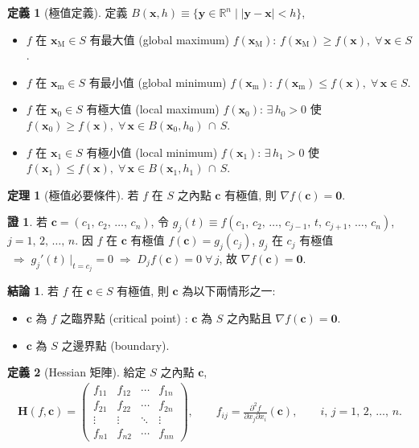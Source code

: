 \documentclass[12pt]{extarticle}
\newcommand{\ds}{\displaystyle}
\newcommand{\ie}{\;\Longrightarrow\;}
\theoremstyle{definition}
\newtheorem*{dfn}{定義}
\newtheorem*{fact}{結論}
\newtheorem*{thm}{定理}
\newtheorem*{prf}{證}
\newcommand{\vc}{\mathbf{c}}
\newcommand{\vx}{\mathbf{x}}
\newcommand{\vy}{\mathbf{y}}
\newcommand{\vH}{\mathbf{H}}
\newcommand{\vZero}{\mathbf{0}}
\begin{document}
\begin{dfn}[極值定義] 定義 $\ds B(\vx, h)\equiv\{\vy\in\mathbb{R}^n\;|\;|\vy - \vx| < h\}$,
  \begin{itemize}\setlength\itemsep{0em}
    \item $f$ 在 $\ds\vx_\text{M}\in S$ 有最大值 (global maximum) $\ds f(\vx_\text{M})$: $\ds f(\vx_\text{M})\geqslant f(\vx),\;\forall\,\vx\in S$. 
    \item $f$ 在 $\ds \vx_\text{m}\in S$ 有最小值 (global minimum) $\ds f(\vx_\text{m})$: $\ds f(\vx_\text{m})\leqslant f(\vx),\;\forall\,\vx\in S$. 
    \item $f$ 在 $\ds\vx_0\in S$ 有極大值 (local maximum) $\ds f(\vx_0)$: $\ds\exists\,h_0 > 0$ 使 $\ds f(\vx_0)\geqslant f(\vx),\;\forall\,\vx\in B(\vx_0, h_0)\,\cap\,S$. 
    \item $f$ 在 $\ds\vx_1\in S$ 有極小值 (local minimum) $\ds f(\vx_1)$: $\ds\exists\,h_1 > 0$ 使 $\ds f(\vx_1)\leqslant f(\vx),\;\forall\,\vx\in B(\vx_1, h_1)\,\cap\,S$. 
  \end{itemize}
\end{dfn}

\begin{thm}[極值必要條件]
  若 $f$ 在 $S$ 之內點 $\vc$ 有極值, 則 $\ds\nabla f(\vc) = \vZero$. 
\end{thm}

\begin{prf}
  若 $\ds\vc = (c_1,\,c_2,\,\ldots,\,c_n)$, 令 $\ds g_j(t)\equiv f(c_1,\,c_2,\,\ldots,\,c_{j - 1},\,t,\,c_{j + 1},\,\ldots,\,c_n)$, $j = 1,\,2,\,\ldots,\,n$. 因 $f$ 在 $\vc$ 有極值 $f(\vc) = g_j(c_j)$, $g_j$ 在 $c_j$ 有極值 $\ie g_j'(t)\,\big|_{t = c_j} = 0 \ie D_j f(\vc) = 0\;\forall\,j$, 故 $\ds\nabla f(\vc) = \vZero$.  
\end{prf}

\begin{fact}
  若 $f$ 在 $\vc\in S$ 有極值, 則 $\vc$ 為以下兩情形之一: 
  \begin{itemize}\setlength\itemsep{0em}
    \item $\vc$ 為 $f$ 之臨界點 (critical point) : $\vc$ 為 $S$ 之內點且 $\nabla f(\vc) = \vZero$. 
    \item $\vc$ 為 $S$ 之邊界點 (boundary). 
  \end{itemize}
\end{fact}

\begin{dfn}[Hessian 矩陣]
  給定 $S$ 之內點 $\vc$, 
  \begin{align*}
    \vH(f, \vc) = \begin{pmatrix}f_{11} & f_{12} & \cdots & f_{1n} \\ f_{21} & f_{22} & \cdots & f_{2n} \\ \vdots & \vdots & \ddots & \vdots \\ f_{n1} & f_{n2} & \cdots & f_{nn}\end{pmatrix}, \qquad f_{ij} = \frac{\partial^2 f}{\partial x_j\partial x_i}(\vc), \qquad i,\,j = 1,\,2,\,\ldots,\,n.
  \end{align*}
\end{dfn}
\end{document}

